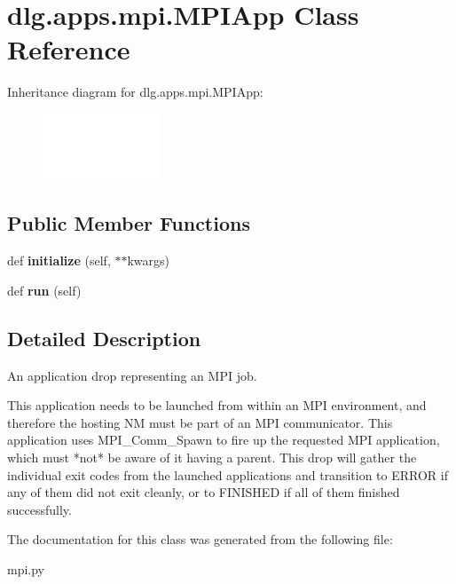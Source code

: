 \hypertarget{classdlg_1_1apps_1_1mpi_1_1_m_p_i_app}{}\section{dlg.\+apps.\+mpi.\+M\+P\+I\+App Class Reference}
\label{classdlg_1_1apps_1_1mpi_1_1_m_p_i_app}
Inheritance diagram for dlg.\+apps.\+mpi.\+M\+P\+I\+App\+:\begin{figure}[H]
\begin{center}
\leavevmode
\includegraphics[height=2.000000cm]{classdlg_1_1apps_1_1mpi_1_1_m_p_i_app}
\end{center}
\end{figure}
\subsection*{Public Member Functions}
\begin{DoxyCompactItemize}
\item 
\mbox{\label{classdlg_1_1apps_1_1mpi_1_1_m_p_i_app_a09977a21be4c213a3b4ca1ecf8496d69}} 
def {\bfseries initialize} (self, $\ast$$\ast$kwargs)
\item 
\mbox{\label{classdlg_1_1apps_1_1mpi_1_1_m_p_i_app_a305ccf8b267af552871f6094dbe87145}} 
def {\bfseries run} (self)
\end{DoxyCompactItemize}


\subsection{Detailed Description}
\begin{DoxyVerb}An application drop representing an MPI job.

This application needs to be launched from within an MPI environment,
and therefore the hosting NM must be part of an MPI communicator.
This application uses MPI_Comm_Spawn to fire up the requested MPI
application, which must *not* be aware of it having a parent.
This drop will gather the individual exit codes from the launched
applications and transition to ERROR if any of them did not exit cleanly,
or to FINISHED if all of them finished successfully.
\end{DoxyVerb}
 

The documentation for this class was generated from the following file\+:\begin{DoxyCompactItemize}
\item 
mpi.\+py\end{DoxyCompactItemize}
